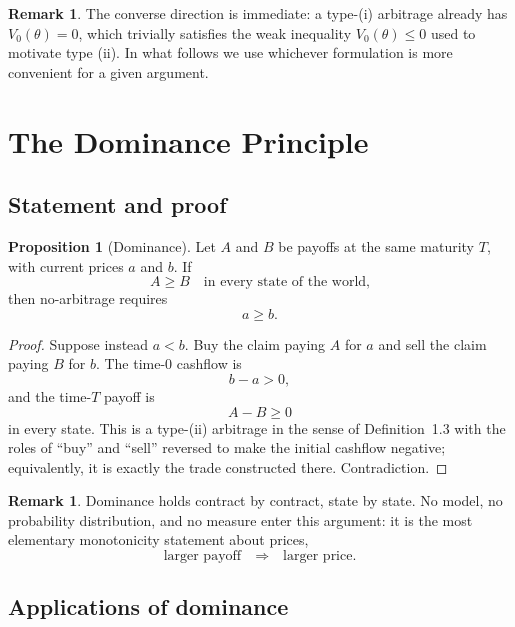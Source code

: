 \documentclass[10pt]{article}
\newcommand{\1}{\mathbf 1}
\theoremstyle{definition}
\newtheorem{proposition}[definition]{Proposition}
\newtheorem{remark}[definition]{Remark}
\begin{document}
\begin{remark}
The converse direction is immediate: a type-(i) arbitrage already has
\(V_0(\theta)=0\), which trivially satisfies the weak inequality
\(V_0(\theta)\leq0\) used to motivate type (ii). In what follows we use
whichever formulation is more convenient for a given argument.
\end{remark}

\section{The Dominance Principle}

\subsection{Statement and proof}

\begin{proposition}[Dominance]
Let \(A\) and \(B\) be payoffs at the same maturity \(T\), with current
prices \(a\) and \(b\). If
\[
A\geq B\quad\text{in every state of the world,}
\]
then no-arbitrage requires
\[
\boxed{a\geq b.}
\]
\end{proposition}

\begin{proof}
Suppose instead \(a<b\). Buy the claim paying \(A\) for \(a\) and sell the
claim paying \(B\) for \(b\). The time-\(0\) cashflow is
\[
b-a>0,
\]
and the time-\(T\) payoff is
\[
A-B\geq0
\]
in every state. This is a type-(ii) arbitrage in the sense of
Definition~1.3 with the roles of ``buy'' and ``sell'' reversed to make the
initial cashflow negative; equivalently, it is exactly the trade
constructed there. Contradiction.
\end{proof}

\begin{remark}
Dominance holds contract by contract, state by state. No model, no
probability distribution, and no measure enter this argument: it is the
most elementary monotonicity statement about prices,
\[
\text{larger payoff}\quad\Longrightarrow\quad\text{larger price.}
\]
\end{remark}

\subsection{Applications of dominance}
\end{document}
